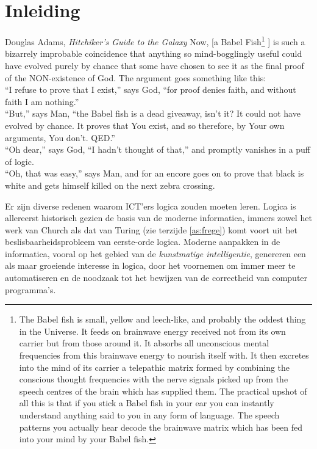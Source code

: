\chapter{Inleiding}
\begin{chapquote}[30pt]{Douglas Adams, \textit{Hitchiker's Guide to the Galaxy}}
Now, [a Babel Fish\footnote{The Babel fish is small, yellow and leech-like, and probably the oddest thing in the Universe. It feeds on brainwave energy received not from its own carrier but from those around it. It absorbs all unconscious mental frequencies from this brainwave energy to nourish itself with. It then excretes into the mind of its carrier a telepathic matrix formed by combining the conscious thought frequencies with the nerve signals picked up from the speech centres of the brain which has supplied them. The practical upshot of all this is that if you stick a Babel fish in your ear you can instantly understand anything said to you in any form of language. The speech patterns you actually hear decode the brainwave matrix which has been fed into your mind by your Babel fish.\citep{adams}}%
] is such a bizarrely improbable coincidence that anything so mind-bogglingly useful could have evolved purely by chance that some have chosen to see it as the final proof of the NON-existence of God. The argument goes something like this:\\[2.5pt]
\enquote{I refuse to prove that I exist,} says God, \enquote{for proof denies faith, and without faith I am nothing.}\\[2.5pt]
\enquote{But,} says Man, \enquote{the Babel fish is a dead giveaway, isn't it? It could not have evolved by chance. It proves that You exist, and so therefore, by Your own arguments, You don't. QED.}\\[2.5pt]
\enquote{Oh dear,} says God, \enquote{I hadn't thought of that,} and promptly vanishes in a puff of logic.\\[2.5pt]
\enquote{Oh, that was easy,} says Man, and for an encore goes on to prove that black is white and gets himself killed on the next zebra crossing.
\end{chapquote}

Er zijn diverse redenen waarom ICT'ers logica zouden moeten leren. Logica is allereerst historisch gezien de basis van de moderne informatica, immers zowel het werk van Church als dat van Turing (zie terzijde \ref{as:frege}) komt voort uit het beslisbaarheidsprobleem van eerste-orde logica. Moderne aanpakken in de informatica, vooral op het gebied van de \emph{kunstmatige intelligentie}, genereren een als maar groeiende interesse in logica, door het voornemen om immer meer te automatiseren en de noodzaak tot het bewijzen van de correctheid van computer programma's. 

